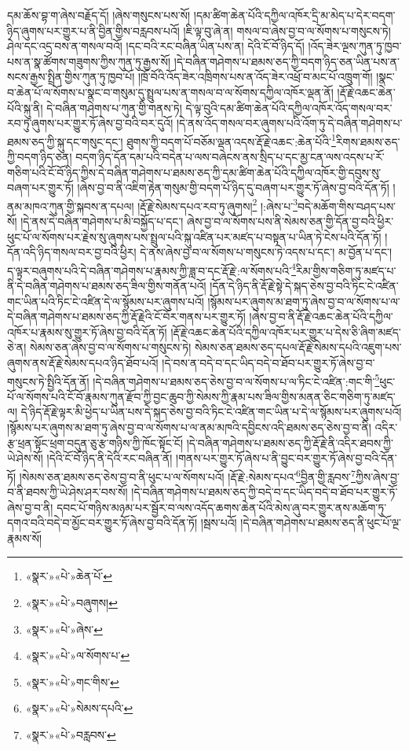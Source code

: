 དམ་ཆོས་བྷ་ག་ཞེས་བརྗོད་དོ། །ཞེས་གསུངས་པས་སོ། །དམ་ཚིག་ཆེན་པོའི་དཀྱིལ་འཁོར་དྲི་མ་མེད་པ་དེར་བདག་ཉིད་ཞུགས་པར་གྱུར་པ་ནི་བྱིན་གྱིས་བརླབས་པའོ། །ཇི་ལྟ་བུ་ཞེ་ན། གསལ་བ་ཞེས་བྱ་བ་ལ་སོགས་པ་གསུངས་ཏེ། ཤེལ་དང་འདྲ་བས་ན་གསལ་བའོ། །དང་བའི་རང་བཞིན་ཡིན་པས་ན། དེའི་ངོ་བོ་ཉིད་དོ། །འོད་ཟེར་ལྔས་ཀུན་ཏུ་ཁྱབ་པས་ན་སྣ་ཚོགས་གཟུགས་ཀྱིས་ཀུན་ཏུ་རྒྱས་སོ། །དེ་བཞིན་གཤེགས་པ་ཐམས་ཅད་ཀྱི་བདག་ཉིད་ཅན་ཡིན་པས་ན་སངས་རྒྱས་སྤྲིན་གྱིས་ཀུན་ཏུ་ཁྱབ་པོ། །ཁྲོ་བོའི་འོད་ཟེར་འཁྲིགས་པས་ན་འོད་ཟེར་འཕྲོ་བ་མང་པོ་འཁྲུག་གོ། །སྣང་བ་ཆེན་པོ་ལ་སོགས་པ་སྣང་བ་གསུམ་དུ་སྤྲུལ་པས་ན་གསལ་བ་ལ་སོགས་དཀྱིལ་འཁོར་ལྡན་ནོ། །རྡོ་རྗེ་འཆང་ཆེན་པོའི་སྐུ་ནི། དེ་བཞིན་གཤེགས་པ་ཀུན་གྱི་གནས་ཏེ། དེ་ལྟ་བུའི་དམ་ཚིག་ཆེན་པོའི་དཀྱིལ་འཁོར་འོད་གསལ་བར་རབ་ཏུ་ཞུགས་པར་གྱུར་ཏོ་ཞེས་བྱ་བའི་བར་དུའོ། །དེ་ནས་འོད་གསལ་བར་ཞུགས་པའི་འོག་ཏུ་དེ་བཞིན་གཤེགས་པ་ཐམས་ཅད་ཀྱི་སྐུ་དང་གསུང་དང་། ཐུགས་ཀྱི་བདག་པོ་བཅོམ་ལྡན་འདས་རྡོ་རྗེ་འཆང་:ཆེན་པོའི་\footnote{«སྣར་»«པེ་»ཆེན་པོ་}རིགས་ཐམས་ཅད་ཀྱི་བདག་ཉིད་ཅན། བདག་ཉིད་དོན་དམ་པའི་བདེན་པ་ལས་བཞེངས་ནས་སྲིད་པ་དང་མྱ་ངན་ལས་འདས་པ་རོ་གཅིག་པའི་ངོ་བོ་ཉིད་ཀྱིས་དེ་བཞིན་གཤེགས་པ་ཐམས་ཅད་ཀྱི་དམ་ཚིག་ཆེན་པོའི་དཀྱིལ་འཁོར་གྱི་དབུས་སུ་བཞག་པར་གྱུར་ཏོ། །ཞེས་བྱ་བ་ནི་འཇིག་རྟེན་གསུམ་གྱི་བདག་པོ་ཉིད་དུ་བཞག་པར་གྱུར་ཏོ་ཞེས་བྱ་བའི་དོན་ཏོ། །ནམ་མཁའ་ཀུན་གྱི་སྐབས་ན་དཔལ། །རྡོ་རྗེ་སེམས་དཔའ་རབ་ཏུ་ཞུགས།\footnote{«སྣར་»«པེ་»བཞུགས།} །:ཞེས་པ་\footnote{«སྣར་»«པེ་»ཞེས་}བདེ་མཆོག་གིས་བཤད་པས་སོ། །དེ་ནས་དེ་བཞིན་གཤེགས་པ་མི་བསྐྱོད་པ་དང་། ཞེས་བྱ་བ་ལ་སོགས་པས་ནི་སེམས་ཅན་གྱི་དོན་བྱ་བའི་ཕྱིར་ཕུང་པོ་ལ་སོགས་པར་རྗེས་སུ་ཞུགས་པས་སྤྲུལ་པའི་སྐུ་འཛིན་པར་མཛད་པ་བསྟན་པ་ཡིན་ཏེ་ངེས་པའི་དོན་ཏོ། །དོན་འདི་ཉིད་གསལ་བར་བྱ་བའི་ཕྱིར། དེ་ནས་ཞེས་བྱ་བ་ལ་སོགས་པ་གསུངས་ཏེ་འདས་པ་དང་། མ་བྱོན་པ་དང་། ད་ལྟར་བཞུགས་པའི་དེ་བཞིན་གཤེགས་པ་རྣམས་ཀྱི་ཟླ་བ་དང་རྡོ་རྗེ་:ལ་སོགས་པའི་\footnote{«སྣར་»«པེ་»ལ་སོགས་པ་}རིམ་གྱིས་གཅིག་ཏུ་མཛད་པ་ནི་དེ་བཞིན་གཤེགས་པ་ཐམས་ཅད་ཟིལ་གྱིས་གནོན་པའོ། །དོན་དེ་ཉིད་ནི་རྡོ་རྗེ་སྟེ་དེ་སྐད་ཅེས་བྱ་བའི་ཏིང་ངེ་འཛིན་གང་ཡིན་པའི་ཏིང་ངེ་འཛིན་དེ་ལ་སྙོམས་པར་ཞུགས་པའོ། །སྙོམས་པར་ཞུགས་མ་ཐག་ཏུ་ཞེས་བྱ་བ་ལ་སོགས་པ་ལ་དེ་བཞིན་གཤེགས་པ་ཐམས་ཅད་ཀྱི་རྡོ་རྗེའི་ངོ་བོར་གནས་པར་གྱུར་ཏོ། །ཞེས་བྱ་བ་ནི་རྡོ་རྗེ་འཆང་ཆེན་པོའི་དཀྱིལ་འཁོར་པ་རྣམས་སུ་གྱུར་ཏོ་ཞེས་བྱ་བའི་དོན་ཏོ། །རྡོ་རྗེ་འཆང་ཆེན་པོའི་དཀྱིལ་འཁོར་པར་གྱུར་པ་དེས་ཅི་ཞིག་མཛད་ཅེ་ན། སེམས་ཅན་ཞེས་བྱ་བ་ལ་སོགས་པ་གསུངས་ཏེ། སེམས་ཅན་ཐམས་ཅད་དཔལ་རྡོ་རྗེ་སེམས་དཔའི་འཇུག་པས་ཞུགས་ནས་རྡོ་རྗེ་སེམས་དཔའ་ཉིད་ཐོབ་པའོ། །དེ་བས་ན་བདེ་བ་དང་ཡིད་བདེ་བ་ཐོབ་པར་གྱུར་ཏོ་ཞེས་བྱ་བ་གསུངས་ཏེ་སྤྱིའི་དོན་ནོ། །དེ་བཞིན་གཤེགས་པ་ཐམས་ཅད་ཅེས་བྱ་བ་ལ་སོགས་པ་ལ་ཏིང་ངེ་འཛིན་:གང་གི་\footnote{«སྣར་»«པེ་»གང་གིས་}ཕུང་པོ་ལ་སོགས་པའི་ངོ་བོ་རྣམས་ཀུན་རྫོབ་ཀྱི་བྱང་ཆུབ་ཀྱི་སེམས་ཀྱི་རྣམ་པས་ཟིལ་གྱིས་མནན་ཅིང་གཅིག་ཏུ་མཛད་ལ། དེ་ཉིད་རྡོ་རྗེ་ལྟར་མི་ཕྱེད་པ་ཡིན་པས་དེ་སྐད་ཅེས་བྱ་བའི་ཏིང་ངེ་འཛིན་གང་ཡིན་པ་དེ་ལ་སྙོམས་པར་ཞུགས་པའོ། །སྙོམས་པར་ཞུགས་མ་ཐག་ཏུ་ཞེས་བྱ་བ་ལ་སོགས་པ་ལ་ནམ་མཁའི་དབྱིངས་འདི་ཐམས་ཅད་ཅེས་བྱ་བ་ནི། འདིར་རྩ་ཕྲན་སྟོང་ཕྲག་བདུན་ཅུ་རྩ་གཉིས་ཀྱི་ཁོང་སྟོང་ངོ། །དེ་བཞིན་གཤེགས་པ་ཐམས་ཅད་ཀྱི་རྡོ་རྗེ་ནི་འདིར་ཐབས་ཀྱི་ཡེ་ཤེས་སོ། །དེའི་ངོ་བོ་ཉིད་ནི་དེའི་རང་བཞིན་ནོ། །གནས་པར་གྱུར་ཏོ་ཞེས་པ་ནི་བྱུང་བར་གྱུར་ཏོ་ཞེས་བྱ་བའི་དོན་ཏོ། །སེམས་ཅན་ཐམས་ཅད་ཅེས་བྱ་བ་ནི་ཕུང་པ་ལ་སོགས་པའོ། །རྡོ་རྗེ་:སེམས་དཔའ་\footnote{«སྣར་»«པེ་»སེམས་དཔའི་}བྱིན་གྱི་རླབས་\footnote{«སྣར་»«པེ་»བརླབས་}ཀྱིས་ཞེས་བྱ་བ་ནི་ཐབས་ཀྱི་ཡེ་ཤེས་ཤར་བས་སོ། །དེ་བཞིན་གཤེགས་པ་ཐམས་ཅད་ཀྱི་བདེ་བ་དང་ཡིད་བདེ་བ་ཐོབ་པར་གྱུར་ཏོ་ཞེས་བྱ་བ་ནི། དབང་པོ་གཉིས་མཉམ་པར་སྦྱོར་བ་ལས་འདོད་ཆགས་ཆེན་པོའི་མེས་ཞུ་བར་གྱུར་ནས་མཆོག་ཏུ་དགའ་བའི་བདེ་བ་མྱོང་བར་གྱུར་ཏོ་ཞེས་བྱ་བའི་དོན་ཏོ། །སྦས་པའོ། །དེ་བཞིན་གཤེགས་པ་ཐམས་ཅད་ནི་ཕུང་པོ་ལྔ་རྣམས་སོ། 